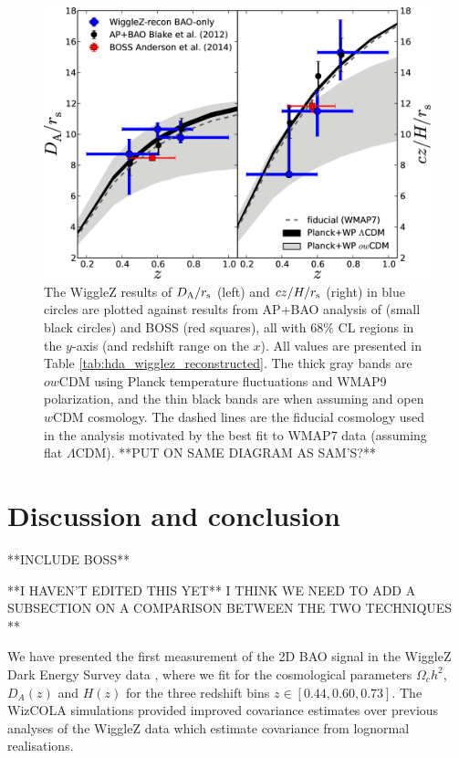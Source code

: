 \documentclass[iop,twocolappendix]{emulateapj}
\newcommand{\green}{\color{green}}
\newcommand{\red}{\color{red}}
\begin{document}
\begin{figure}
\begin{center}
\includegraphics[width=0.7\columnwidth]{figures/hubble_HDa/hubble_HDa}
\caption{\label{fig:hubble_diagram} The WiggleZ results of $D_{\rm A}/r_{\rm s}$ (left) and $cz/H/r_{\rm s}$ (right) in blue circles are plotted against results from AP+BAO analysis of \cite{BlakeBroughColless2012} (small black circles) and BOSS \cite{AndersonAubourg2014} (red squares), all with 68$\%$ CL regions in the $y$-axis (and redshift range on the $x$). All values are presented in Table \ref{tab:hda_wigglez_reconstructed}. The thick gray bands are $ow$CDM using Planck temperature fluctuations and WMAP9 polarization, and the thin black bands are when assuming and open $w$CDM cosmology. The dashed lines are the fiducial cosmology used in the analysis motivated by the best fit to WMAP7 data (assuming flat $\Lambda$CDM).%
{\red **PUT ON SAME DIAGRAM AS SAM'S?** }
}
\end{center}
\end{figure}










\section{Discussion and conclusion}

\label{sec:disc}
\label{sec:conclusion}

{\green **INCLUDE BOSS**}

{\red **I HAVEN'T EDITED THIS YET**  I THINK WE NEED TO ADD A SUBSECTION ON A COMPARISON BETWEEN THE TWO TECHNIQUES **}

We have presented the first measurement of the 2D BAO signal in the WiggleZ Dark Energy Survey data \citep{KazinKoda2014}, where we fit for the cosmological parameters $\Omega_c h^2$, $D_A(z)$ and $H(z)$ for the three redshift bins $z \in \left[0.44, 0.60, 0.73\right]$.  The WizCOLA simulations provided improved covariance estimates over previous analyses of the WiggleZ data which estimate covariance from lognormal realisations.
\end{document}
